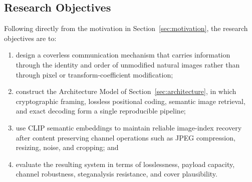 \documentclass[10pt,a4paper]{article}
\theoremstyle{definition}
\begin{document}
\subsection{Research Objectives}\label{sec:objectives}
Following directly from the motivation in Section~\ref{sec:motivation}, the
research objectives are to:
\begin{enumerate}
  \item design a coverless communication mechanism that carries information through
        the identity and order of unmodified natural images rather than through
        pixel or transform-coefficient modification;
  \item construct the Architecture Model of Section~\ref{sec:architecture}, in
        which cryptographic framing, lossless positional coding, semantic image
        retrieval, and exact decoding form a single reproducible pipeline;
  \item use CLIP semantic embeddings to maintain reliable image-index recovery
        after content preserving channel operations such as JPEG compression,
        resizing, noise, and cropping; and
  \item evaluate the resulting system in terms of losslessness, payload capacity,
        channel robustness, steganalysis resistance, and cover plausibility.
\end{enumerate}
\end{document}
